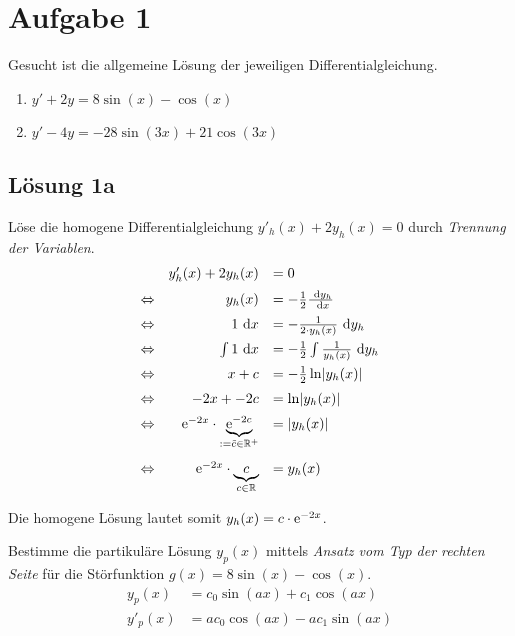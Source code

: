 \documentclass[main.tex]{subfiles}
\begin{document}
\section{Aufgabe 1}
Gesucht ist die allgemeine Lösung der jeweiligen Differentialgleichung.
\begin{enumerate}
    \item $y' + 2y = 8\sin(x) - \cos(x)$
    \item $y' - 4y = -28\sin(3x) + 21\cos(3x)$
\end{enumerate}

\subsection{Lösung 1a}

Löse die homogene Differentialgleichung $y'_h(x) + 2y_h(x) = 0$ durch \textit{Trennung der Variablen}.
\begin{equation*}
\begin{array}{rrl}
                & y'_h(x) + 2y_h(x) &= 0 \\[2mm]
\Leftrightarrow & y_h(x) &= -\frac{1}{2} \frac{~\mathrm{d}y_h}{~\mathrm{d}x} \\[2mm]
\Leftrightarrow & 1 ~\mathrm{d}x &= -\frac{1}{2\cdot y_h(x)} ~\mathrm{d}y_h \\[2mm]
\Leftrightarrow & \int 1 ~\mathrm{d}x &= -\frac{1}{2} \int \frac{1}{y_h(x)} ~\mathrm{d}y_h \\[2mm]
\Leftrightarrow & x + c &= -\frac{1}{2} \ln \lvert y_h(x)\rvert \\[2mm]
\Leftrightarrow & -2x + -2c &= \ln \lvert y_h(x)\rvert \\[2mm]
\Leftrightarrow & \mathrm{e}^{-2x} \cdot \underbrace{\mathrm{e}^{-2c}}_{:=\tilde{c} \in \mathbb{R^+}} &= \lvert y_h(x)\rvert \\[7mm]
\Leftrightarrow & \mathrm{e}^{-2x} \cdot \underbrace{c}_{c \in \mathbb{R}} &= y_h(x) \\[2mm]
\end{array}
\end{equation*}

Die homogene Lösung lautet somit $y_h(x) = c \cdot \mathrm{e}^{-2x}$.

Bestimme die partikuläre Lösung $y_p(x)$ mittels \textit{Ansatz vom Typ der rechten Seite} für die Störfunktion $g(x) = 8\sin(x) - \cos(x)$.
\begin{align*}
    y_p(x)  &= c_0 \sin (ax) + c_1\cos(ax) \\
    y'_p(x) &= ac_0 \cos (ax) - ac_1\sin(ax)
\end{align*}
\end{document}
